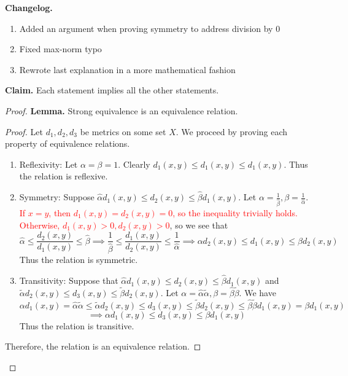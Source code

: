\documentclass{article}
\theoremstyle{plain} %
\numberwithin{thm}{section} %
\theoremstyle{definition}
\begin{document}
        \noindent\textbf{Changelog.}
        \begin{enumerate}
            \item Added an argument when proving symmetry to address division by 0
            \item Fixed max-norm typo
            \item Rewrote last explanation in a more mathematical fashion
        \end{enumerate}

        \noindent\textbf{Claim.} Each statement implies all the other statements.
        \begin{proof}
            \textbf{Lemma.} Strong equivalence is an equivalence relation.
            \begin{proof}
                Let \(d_1, d_2, d_3\) be metrics on some set \(X\). We proceed by proving each property of equivalence relations.
                \begin{enumerate}
                    \item Reflexivity:
                    Let \(\alpha = \beta = 1\). Clearly \(d_1(x,y) \leq d_1(x,y) \leq d_1(x,y)\). Thus the relation is reflexive.

                    \item Symmetry:
                    Suppose \(\hat{\alpha} d_1(x,y) \leq d_2(x,y) \leq \hat{\beta} d_1(x,y)\). Let \(\alpha = \frac{1}{\hat{\beta}}, \beta = \frac{1}{\hat{\alpha}}\). \textcolor{red}{If \(x=y\), then \(d_1(x,y) = d_2(x,y) = 0\), so the inequality trivially holds.} \textcolor{red}{Otherwise, \(d_1(x,y) > 0, d_2(x,y) > 0\)}, so we see that
                    \[
                        \hat{\alpha} \leq \frac{d_2(x,y)}{d_1(x,y)} \leq \hat{\beta} \implies \frac{1}{\hat{\beta}} \leq \frac{d_1(x,y)}{d_2(x,y)} \leq \frac{1}{\hat{\alpha}} \implies \alpha d_2(x,y) \leq d_1(x,y) \leq \beta d_2(x,y)
                    \]
                    Thus the relation is symmetric.

                    \item Transitivity:
                    Suppose that \(\hat{\alpha} d_1(x,y) \leq d_2(x,y) \leq \hat{\beta} d_1(x,y)\) and \(\tilde{\alpha} d_2(x,y) \leq d_3(x,y) \leq \tilde{\beta} d_2(x,y)\). Let \(\alpha = \hat{\alpha}\tilde{\alpha}, \beta = \hat{\beta}\tilde{\beta}\). We have
                    \[
                        \alpha d_1(x,y) = \hat{\alpha}\tilde{\alpha} \leq \tilde{\alpha}d_2(x,y) \leq d_3(x,y) \leq \tilde{\beta}d_2(x,y) \leq \hat{\beta}\tilde{\beta}d_1(x,y) = \beta d_1(x,y)
                    \]
                    \[
                        \implies \alpha d_1(x,y) \leq d_3(x,y) \leq \beta d_1(x,y)
                    \]
                    Thus the relation is transitive.
                \end{enumerate}
                Therefore, the relation is an equivalence relation.
            \end{proof}
            

\end{proof}
\end{document}
